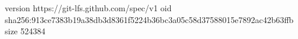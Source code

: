 version https://git-lfs.github.com/spec/v1
oid sha256:913ce7383b19a38db3d8361f5224b36bc3a05c58d37588015e7892ac42b63ffb
size 524384
